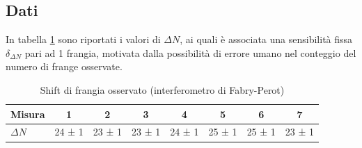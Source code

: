 \documentclass[a4paper]{article}
\begin{document}
\subsection{Dati}
In tabella \ref{tab: micrometro fabry-perot} sono riportati i valori di $\Delta N$, ai quali è associata una sensibilità fissa $\delta_{\Delta N}$ pari ad 1 frangia, motivata dalla possibilità di errore umano nel conteggio del numero di frange osservate.

\begin{table}[htbp]
\centering
\caption{Shift di frangia osservato (interferometro di Fabry-Perot)}
\begin{tabular}{|l|ccccccc|}
\hline
Misura & 1 & 2 & 3 & 4 & 5 & 6 & 7 \\\hline\hline
$\Delta N$ & 24 ± 1 & 23 ± 1 & 23 ± 1 & 24 ± 1 & 25 ± 1 & 25 ± 1 & 23 ± 1 \\\hline
\end{tabular}
\label{tab: micrometro fabry-perot}
\end{table}
\end{document}
